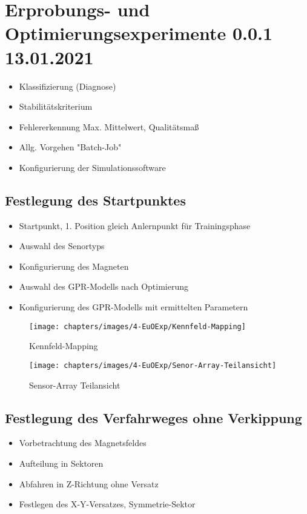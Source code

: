%

\chapter{Erprobungs- und Optimierungsexperimente 0.0.1 13.01.2021}\label{ch:erprobungs-u-opt-exp}
	\begin{itemize}
		\item Klassifizierung (Diagnose)
		\item Stabilitätskriterium
		\item Fehlererkennung Max. Mittelwert, Qualitätsmaß
		\item Allg. Vorgehen "Batch-Job"
		\item Konfigurierung der Simulationssoftware
	\end{itemize}

\section{Festlegung des Startpunktes}\label{sec:festlegung-des-startpunktes}
	\begin{itemize}
		\item Startpunkt, 1. Position gleich Anlernpunkt für Trainingsphase
		\item Auswahl des Senortyps
		\item Konfigurierung des Magneten
		\item Auswahl des GPR-Modells nach Optimierung
		\item Konfigurierung des GPR-Modells mit ermittelten Parametern
	\end{itemize}



\begin{figure}[tbph]
	\centering
	\texttt{[image: chapters/images/4-EuOExp/Kennfeld-Mapping]}
	\caption[Kennfeld-Mapping]{Kennfeld-Mapping}
	\label{fig:kennfeld-mapping}
\end{figure}

\begin{figure}[tbph]
	\centering
	\texttt{[image: chapters/images/4-EuOExp/Senor-Array-Teilansicht]}
	\caption[Sensor-Array Teilansicht]{Sensor-Array Teilansicht}
	\label{fig:senor-array-teilansicht}
\end{figure}

\section{Festlegung des Verfahrweges ohne Verkippung}\label{sec:festlegung-verfahrwe-ohne-verkippung}
	\begin{itemize}
		\item Vorbetrachtung des Magnetsfeldes 
		\item Aufteilung in Sektoren
		\item Abfahren in Z-Richtung ohne Versatz
		\item Festlegen des X-Y-Versatzes, Symmetrie-Sektor		
	\end{itemize}

